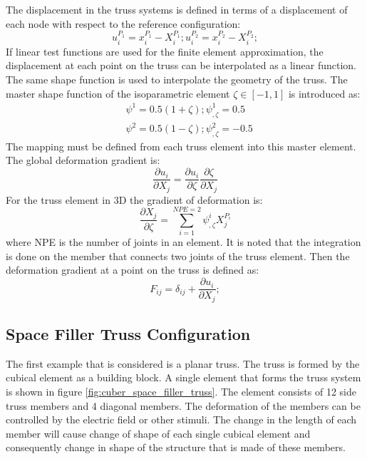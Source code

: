 The displacement in the truss systems is defined in terms of a displacement of each node with respect to the reference configuration: 
\begin{equation}
u^{P_1}_i=x^{P_1}_i-X^{P_1}_i ; u^{P_2}_i=x^{P_2}_i-X^{P_2}_i ;  
\end{equation}
If linear test functions are used for the finite element approximation, the displacement at each point on the truss can be interpolated as a linear function. The same shape function is used to interpolate the geometry of the truss. The master shape function of the isoparametric element $\zeta \in [-1,1]$ is introduced as:
\begin{equation}
\begin{aligned}
& \psi^1=0.5(1+\zeta); \psi^1_{,\zeta}= 0.5 \\
& \psi^2=0.5(1-\zeta); \psi^2_{,\zeta}=-0.5
\end{aligned}
\label{shape_function_truss} 
\end{equation}
The mapping must be defined from each truss element into this master element.
The global deformation gradient is:
\begin{equation}
\frac{\partial u_i}{\partial X_j}=\frac{\partial u_i}{\partial \zeta}
\frac{\partial \zeta}{\partial X_j}
\label{eqn:global_derivitave} 
\end{equation}
For the truss element in 3D the gradient of deformation is:
\begin{equation}
\frac{\partial X_j }{\partial \zeta}= 
  \sum_{i=1}^{NPE=2} \psi^i_{,\zeta} X^{P_i}_j 
\label{eqn:delXi_delzeta} 
\end{equation}
where NPE is the number of joints in an element.
It is noted that the integration is done on the member that connects two joints of the truss element.
Then the deformation gradient at a point on the truss is defined as:
\begin{equation}
F_{ij}=\delta_{ij}+ \frac{\partial u_i}{\partial X_j};  
\end{equation}

\subsection{Space Filler Truss Configuration}
The first example that is considered is a planar truss.
The truss is formed by the cubical element as a building block. 
A single element that forms the truss system is shown in figure \ref{fig:cuber_space_filler_truss}.
The element consists of 12 side truss members and 4 diagonal members.
The deformation of the members can be controlled by the electric field or other stimuli.
The change in the length of each member will cause change of shape of each single cubical element and consequently change in shape of the structure that is made of these members.


